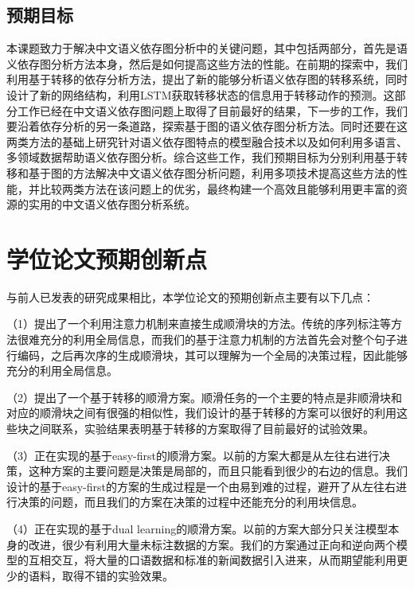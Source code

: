 \subsection{预期目标}

本课题致力于解决中文语义依存图分析中的关键问题，其中包括两部分，首先是语义依存图分析方法本身，然后是如何提高这些方法的性能。在前期的探索中，我们利用基于转移的依存分析方法，提出了新的能够分析语义依存图的转移系统，同时设计了新的网络结构，利用LSTM获取转移状态的信息用于转移动作的预测。这部分工作已经在中文语义依存图问题上取得了目前最好的结果，下一步的工作，我们要沿着依存分析的另一条道路，探索基于图的语义依存图分析方法。同时还要在这两类方法的基础上研究针对语义依存图特点的模型融合技术以及如何利用多语言、多领域数据帮助语义依存图分析。综合这些工作，我们预期目标为分别利用基于转移和基于图的方法解决中文语义依存图分析问题，利用多项技术提高这些方法的性能，并比较两类方法在该问题上的优劣，最终构建一个高效且能够利用更丰富的资源的实用的中文语义依存图分析系统。

\section{学位论文预期创新点}
与前人已发表的研究成果相比，本学位论文的预期创新点主要有以下几点：

（1）提出了一个利用注意力机制来直接生成顺滑块的方法。传统的序列标注等方法很难充分的利用全局信息，而我们的基于注意力机制的方法首先会对整个句子进行编码，之后再次序的生成顺滑块，其可以理解为一个全局的决策过程，因此能够充分的利用全局信息。

（2）提出了一个基于转移的顺滑方案。顺滑任务的一个主要的特点是非顺滑块和对应的顺滑块之间有很强的相似性，我们设计的基于转移的方案可以很好的利用这些块之间联系，实验结果表明基于转移的方案取得了目前最好的试验效果。

（3）正在实现的基于easy-first的顺滑方案。以前的方案大都是从左往右进行决策，这种方案的主要问题是决策是局部的，而且只能看到很少的右边的信息。我们设计的基于easy-first的方案的生成过程是一个由易到难的过程，避开了从左往右进行决策的问题，而且我们的方案在决策的过程中还能充分的利用块信息。

（4）正在实现的基于dual learning的顺滑方案。以前的方案大部分只关注模型本身的改进，很少有利用大量未标注数据的方案。我们的方案通过正向和逆向两个模型的互相交互，将大量的口语数据和标准的新闻数据引入进来，从而期望能利用更少的语料，取得不错的实验效果。



